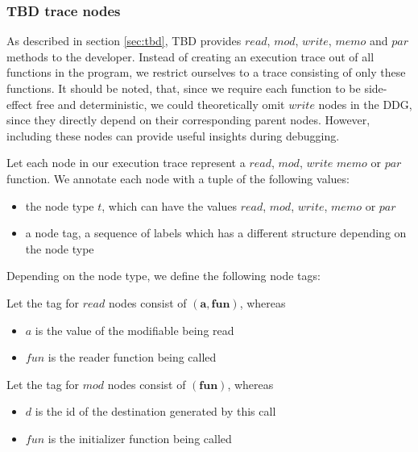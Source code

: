 \subsubsection{TBD trace nodes}
As described in section \ref{sec:tbd}, TBD provides $read$, $mod$, $write$, $memo$ and $par$ methods to the developer. Instead of creating an execution trace out of all  functions in the program, we restrict ourselves to a trace consisting of only these functions. It should be noted, that, since we require each function to be side-effect free and deterministic, we could theoretically omit $write$ nodes in the DDG, since they directly depend on their corresponding parent nodes. However, including these nodes can provide useful insights during debugging. 

\begin{definition}
Let each node in our execution trace represent a $read$, $mod$, $write$ $memo$ or $par$ function. We annotate each node with a tuple of the following values:
\begin{itemize}
\item the node type $t$, which can have the values $read$, $mod$, $write$, $memo$ or $par$
\item a node tag, a sequence of labels which has a different structure depending on the node type 
\end{itemize}
\end{definition}

Depending on the node type, we define the following node tags: 

\begin{definition}
Let the tag for $read$ nodes consist of $\mathbf{(a, fun)}$, whereas
\begin{itemize}
\item $a$ is the value of the modifiable being read
\item $fun$ is the reader function being called
\end{itemize}
\end{definition}

\begin{definition}
Let the tag for $mod$ nodes consist of $\mathbf{(fun)}$, whereas
\begin{itemize}
\item $d$ is the id of the destination generated by this call
\item $fun$ is the initializer function being called
\end{itemize}
\end{definition}

